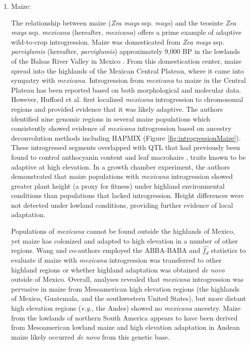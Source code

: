 \documentclass[11pt]{article}
\begin{document}
\begin{enumerate}
\item{Maize:}

The relationship between maize (\emph{Zea mays} ssp. \emph{mays}) and the teosinte \emph{Zea mays} ssp. \emph{mexicana} (hereafter, \emph{mexicana}) offers a prime example of adaptive wild-to-crop introgression.
Maize was domesticated from \emph{Zea mays} ssp. \emph{parviglumis} (hereafter, \emph{parviglumis})  approximately 9,000 BP in the lowlands of the Balsas River Valley in Mexico \cite{matsuoka2002single}.
From this domestication center, maize spread into the highlands of the Mexican Central Plateau, where it came into sympatry with \emph{mexicana}.
Introgression from \emph{mexicana} to maize in the Central Plateau has been reported based on both morphological \cite {wilkes1977} and molecular \cite{vanHeerwaarden2011, doebley1987} data.
However, Hufford et al. \cite{Hufford2013} first localized \emph{mexicana} introgression to chromosomal regions and provided evidence that it was likely adaptive.
The authors identified nine genomic regions in several maize populations which consistently showed evidence of \emph{mexicana} introgression based on ancestry deconvolution methods including HAPMIX (Figure \ref{fig:introgressionMaize}).
These introgressed segments overlapped with QTL that had previously been found to control anthocyanin content and leaf macrohairs \cite{lauter2004}, traits known to be adaptive at high elevation.
In a growth chamber experiment, the authors demonstrated that maize populations with \emph{mexicana} introgression showed greater plant height (a proxy for fitness) under highland environmental conditions than populations that lacked introgression.
Height differences were not detected under lowland conditions, providing further evidence of local adaptation.


Populations of \emph{mexicana} cannot be found outside the highlands of Mexico, yet maize has colonized and adapted to high elevation in a number of other regions.
Wang and co-authors \cite{wang2017} employed the ABBA-BABA and $\hat{f_{d}}$ statistics to evaluate if maize with \emph{mexicana} introgression was transferred to other highland regions or whether highland adaptation was obtained \emph{de novo} outside of Mexico.
Overall, analyses revealed that  \emph{mexicana} introgression was pervasive in maize from Mesoamerican high elevation regions (the highlands of Mexico, Guatemala, and the southwestern United States), but more distant high elevation regions (\emph{e.g.,} the Andes) showed no \emph{mexicana} ancestry.
Maize from the lowlands of northern South America appears to have been derived from Mesoamerican lowland maize and high elevation adaptation in Andean maize likely occurred \emph{de novo} from this genetic base.



\end{enumerate}
\end{document}
